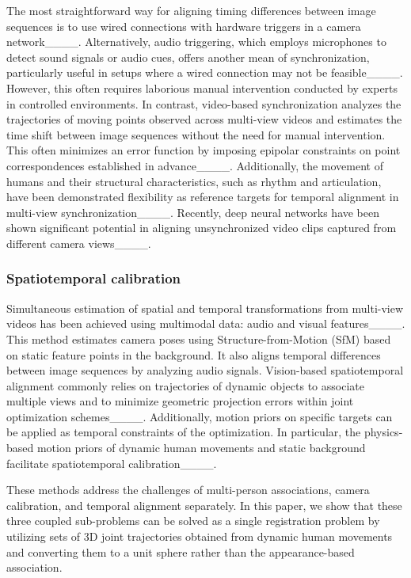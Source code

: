 The most straightforward way for aligning timing differences between image sequences is to use wired connections with hardware triggers in a camera network____. Alternatively, audio triggering, which employs microphones to detect sound signals or audio cues, offers another mean of synchronization, particularly useful in setups where a wired connection may not be feasible____. However, this often requires laborious manual intervention conducted by experts in controlled environments. In contrast, video-based synchronization analyzes the trajectories of moving points observed across multi-view videos and estimates the time shift between image sequences without the need for manual intervention. This often minimizes an error function by imposing epipolar constraints on point correspondences established in advance____. Additionally, the movement of humans and their structural characteristics, such as rhythm and articulation, have been demonstrated flexibility as reference targets for temporal alignment in multi-view synchronization____. Recently, deep neural networks have been shown significant potential in aligning unsynchronized video clips captured from different camera views____. 


\subsubsection{Spatiotemporal calibration}

 

Simultaneous estimation of spatial and temporal transformations from multi-view videos has been achieved using multimodal data: audio and visual features____. This method estimates camera poses using Structure-from-Motion (SfM) based on static feature points in the background. It also aligns temporal differences between image sequences by analyzing audio signals. Vision-based spatiotemporal alignment commonly relies on trajectories of dynamic objects to associate multiple views and to minimize geometric projection errors within joint optimization schemes____. Additionally, motion priors on specific targets can be applied as temporal constraints of the optimization.  In particular, the physics-based motion priors of dynamic human movements and static background facilitate spatiotemporal calibration____.

These methods address the challenges of multi-person associations, camera calibration, and temporal alignment separately. In this paper, we show that these three coupled sub-problems can be solved as a single registration problem by utilizing sets of 3D joint trajectories obtained from dynamic human movements and converting them to a unit sphere rather than the appearance-based association.